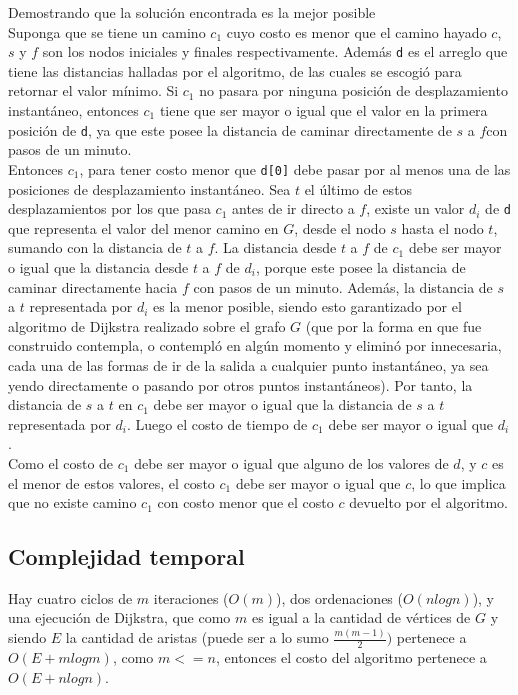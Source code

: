 \documentclass[a4paper,12pt,twocolumn]{article}
\begin{document}
		Demostrando que la solución encontrada es la mejor posible\\
		Suponga que se tiene un camino $c_1$ cuyo costo es menor que el camino hayado $c$, $s$ y $f$ son los nodos iniciales y finales respectivamente. Además \texttt{\ttfamily d} es el arreglo que tiene las distancias halladas por el algoritmo, de las cuales se escogió para retornar el valor mínimo. Si $c_1$ no pasara por ninguna posición de desplazamiento instantáneo, entonces $c_1$ tiene que ser mayor o igual que el valor en la primera posición de \texttt{\ttfamily d}, ya que este posee la distancia de caminar directamente de $s$ a $f$con pasos de un minuto.\\
		Entonces $c_1$, para tener costo menor que \texttt{\ttfamily d[0]} debe pasar por al menos una de las posiciones de desplazamiento instantáneo. Sea $t$ el último de estos desplazamientos por los que pasa $c_1$ antes de ir directo a $f$, existe un valor $d_i$ de \texttt{\ttfamily d} que representa el valor del menor camino en $G$, desde el nodo $s$ hasta el nodo $t$, sumando con la distancia de $t$ a $f$. La distancia desde $t$ a $f$ de $c_1$ debe ser mayor o igual que la distancia desde $t$ a $f$ de $d_i$, porque este posee la distancia de caminar directamente hacia $f$ con pasos de un minuto. Además, la distancia de $s$ a $t$ representada por $d_i$ es la menor posible, siendo esto garantizado por el algoritmo de Dijkstra realizado sobre el grafo $G$ (que por la forma en que fue construido contempla, o contempló en algún momento y eliminó por innecesaria, cada una de las formas de ir de la salida a cualquier punto instantáneo, ya sea yendo directamente o pasando por otros puntos instantáneos). Por tanto, la distancia de $s$ a $t$ en $c_1$ debe ser mayor o igual que la distancia de $s$ a $t$ representada por $d_i$. Luego el costo de tiempo de $c_1$ debe ser mayor o igual que $d_i$.\\
		Como el costo de $c_1$ debe ser mayor o igual que alguno de los valores de $d$, y $c$ es el menor de estos valores, el costo $c_1$ debe ser mayor o igual que $c$, lo que implica que no existe camino $c_1$ con costo menor que el costo $c$ devuelto por el algoritmo.
		\subsection{Complejidad temporal}
			Hay cuatro ciclos de $m$ iteraciones ($O(m)$), dos ordenaciones ($O(n  log n)$), y una ejecución de Dijkstra, que como $m$ es igual a la cantidad de vértices de $G$ y siendo $E$ la cantidad de aristas (puede ser a lo sumo $\frac{m(m-1)}{2})$ pertenece a $O(E + m log m)$, como $m<=n$, entonces el costo del algoritmo pertenece a $O(E + n log n)$.
\label{end}
\end{document}
